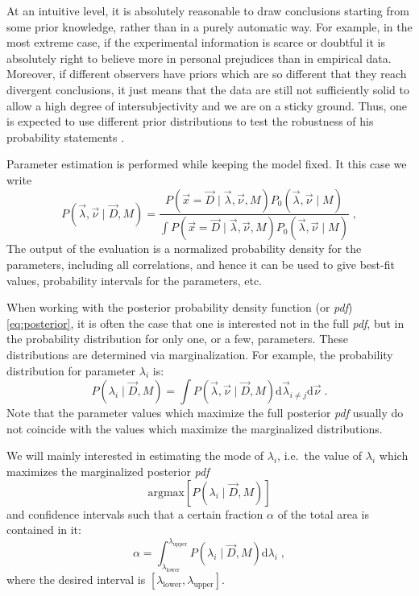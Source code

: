 At an intuitive level, it is absolutely reasonable to draw conclusions starting from some prior knowledge, rather than in a purely automatic way. For example, in the most extreme case, if the experimental information is scarce or doubtful it is absolutely right to believe more in personal prejudices than in empirical data. Moreover, if different observers have priors which are so different that they reach divergent conclusions, it just means that the data are still not sufficiently solid to allow a high degree of intersubjectivity and we are on a sticky ground. Thus, one is expected to use different prior distributions to test the robustness of his probability statements \cite{bayesbook}.

 Parameter estimation is performed while keeping the model fixed. It this case we write
\begin{equation}P(\vec{\lambda},\vec{\nu}\mid\vec{D},M)=\frac{P(\vec{x}=\vec{D}\mid\vec{\lambda},\vec{\nu},M)P_0(\vec{\lambda},\vec{\nu}\mid M)}{\int P(\vec{x}=\vec{D}\mid\vec{\lambda},\vec{\nu},M)P_0(\vec{\lambda},\vec{\nu}\mid M)}\;,\label{eq:posterior}\end{equation}
The output of the evaluation is a normalized probability density for the parameters, including all correlations, and hence it can be used to give best-fit values, probability intervals for the parameters, etc.

When working with the posterior probability density function (or \emph{pdf}) \ref{eq:posterior}, it is often the case that one is interested not in the full \emph{pdf}, but in the probability distribution for only one, or a few, parameters. These distributions are determined via marginalization. For example, the probability distribution for parameter $\lambda_i$ is:
\[P(\lambda_i\mid\vec{D},M)=\int P(\vec{\lambda},\vec{\nu}\mid\vec{D},M)\text{d}\vec{\lambda}_{i\neq j}\text{d}\vec{\nu}\;.\]
Note that the parameter values which maximize the full posterior \emph{pdf} usually do not coincide with the values which maximize the marginalized distributions.

We will mainly interested in estimating the mode of $\lambda_i$, i.e.~the value of $\lambda_i$ which maximizes the marginalized posterior \emph{pdf}
\[\text{argmax}\left[ P(\lambda_i\mid\vec{D},M) \right]\]
and confidence intervals such that a certain fraction $\alpha$ of the total area is contained in it:
\[\alpha=\int^{\lambda_\text{upper}}_{\lambda_\text{lower}}P(\lambda_i\mid\vec{D},M)\text{d}\lambda_i\;,\]
where the desired interval is $[\lambda_\text{lower},\lambda_\text{upper}]$.

